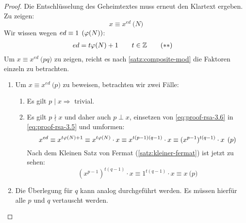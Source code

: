 \begin{proof}
  Die Entschlüsselung des Geheimtextes muss erneut den Klartext ergeben. Zu zeigen:
  \begin{equation}
    \label{eq:proof-rsa-3.5}
    x \equiv x^{ed} \pod{N} \tag{$*$}
  \end{equation}
  Wir wissen wegen $ed \equiv 1 \pod{\varphi(N)}$:
  \begin{align}
    \label{eq:proof-rsa-3.6}
    ed & = t\varphi(N) + 1 \qquad t \in \mathbb{Z} \tag{$**$}
  \end{align}
  Um $x \equiv x^{ed} \pod{pq}$ zu zeigen, reicht es nach \eqref{satz:composite-mod}
  die Faktoren einzeln zu betrachten.
  \begin{enumerate}
    \item Um $x \equiv x^{ed} \pod{p}$ zu beweisen, betrachten wir zwei Fälle:
          \begin{enumerate}[topsep=0pt]
            \item Es gilt $p \mid x \Rightarrow$ trivial.
            \item Es gilt $p \nmid x$ und daher auch $p \perp x$, einsetzen von \eqref{eq:proof-rsa-3.6} in
                  \eqref{eq:proof-rsa-3.5}
                  und umformen:
                  \begin{equation*}
                    x^{ed} \equiv x^{t\varphi(N) + 1} \equiv
                    x^{t\varphi(N)} \cdot x \equiv
                    x^{t(p - 1)(q - 1)} \cdot x \equiv
                    (x^{p - 1})^{t(q - 1)} \cdot x \pod{p}
                  \end{equation*}
                  Nach dem Kleinen Satz von Fermat (\ref{satz:kleiner-fermat}) ist jetzt zu sehen:
                  \begin{equation*}
                    (x^{p - 1})^{t(q - 1)} \cdot x \equiv
                    1^{t(q - 1)} \cdot x \equiv x \pod{p}
                  \end{equation*}
          \end{enumerate}
    \item Die Überlegung für $q$ kann analog durchgeführt werden. Es müssen hierfür
          alle $p$ und $q$ vertauscht werden. \qedhere
  \end{enumerate}
\end{proof}

